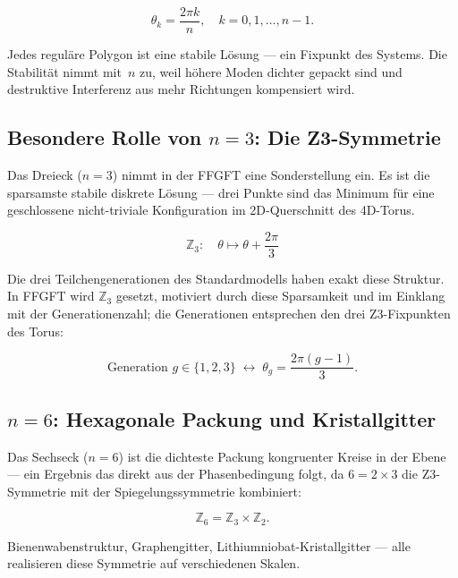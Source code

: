 \begin{equation}
  \theta_k = \frac{2\pi k}{n}, \quad k = 0, 1, \ldots, n-1.
\end{equation}

Jedes reguläre Polygon ist eine stabile Lösung — ein Fixpunkt des Systems.
Die Stabilität nimmt mit~$n$ zu, weil höhere Moden dichter gepackt sind
und destruktive Interferenz aus mehr Richtungen kompensiert wird.

\subsection{Besondere Rolle von $n = 3$: Die Z3-Symmetrie}

Das Dreieck ($n=3$) nimmt in der FFGFT eine Sonderstellung ein. Es ist
die sparsamste stabile diskrete Lösung — drei Punkte sind das Minimum
für eine geschlossene nicht-triviale Konfiguration im 2D-Querschnitt
des 4D-Torus.

\begin{equation}
  \mathbb{Z}_3: \quad \theta \mapsto \theta + \frac{2\pi}{3}
\end{equation}

Die drei Teilchengenerationen des Standardmodells haben exakt diese Struktur.
In FFGFT wird $\mathbb{Z}_3$ gesetzt, motiviert durch diese Sparsamkeit und
im Einklang mit der Generationenzahl; die Generationen entsprechen den drei
Z3-Fixpunkten des Torus:

\begin{equation}
  \text{Generation } g \in \{1, 2, 3\}
  \;\longleftrightarrow\;
  \theta_g = \frac{2\pi(g-1)}{3}.
\end{equation}

\subsection{$n = 6$: Hexagonale Packung und Kristallgitter}

Das Sechseck ($n=6$) ist die dichteste Packung kongruenter Kreise in
der Ebene — ein Ergebnis das direkt aus der Phasenbedingung folgt, da
$6 = 2 \times 3$ die Z3-Symmetrie mit der Spiegelungssymmetrie kombiniert:

\begin{equation}
  \mathbb{Z}_6 = \mathbb{Z}_3 \times \mathbb{Z}_2.
\end{equation}

Bienenwabenstruktur, Graphengitter, Lithiumniobat-Kristallgitter — alle
realisieren diese Symmetrie auf verschiedenen Skalen.

